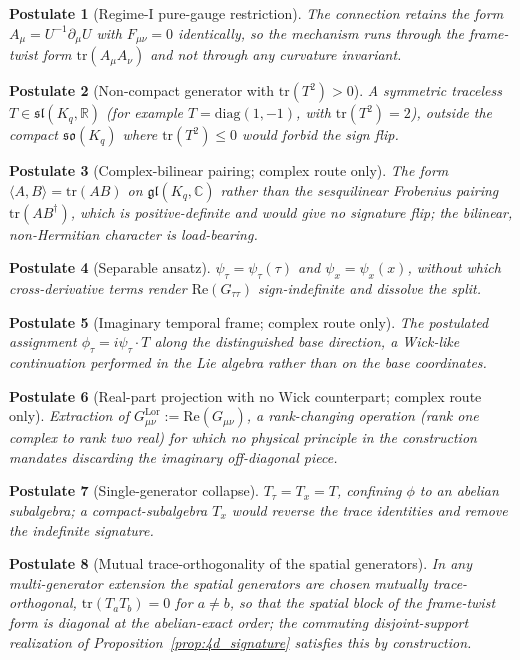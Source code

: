 \documentclass[11pt]{article}
\newtheorem{postulate}{Postulate}
\begin{document}
\begin{postulate}[Regime-I pure-gauge restriction]\label{post:regime1}
The connection retains the form $A_\mu = U^{-1}\partial_\mu U$ with $F_{\mu\nu} = 0$ identically, so the mechanism runs through the frame-twist form $\mathrm{tr}(A_\mu A_\nu)$ and not through any curvature invariant.
\end{postulate}
\begin{postulate}[Non-compact generator with $\mathrm{tr}(T^2) > 0$]\label{post:noncompact}
A symmetric traceless $T \in \mathfrak{sl}(K_q,\mathbb{R})$ (for example $T = \mathrm{diag}(1,-1)$, with $\mathrm{tr}(T^2) = 2$), outside the compact $\mathfrak{so}(K_q)$ where $\mathrm{tr}(T^2) \le 0$ would forbid the sign flip.
\end{postulate}
\begin{postulate}[Complex-bilinear pairing; complex route only]\label{post:pairing}
The form $\langle A, B\rangle = \mathrm{tr}(AB)$ on $\mathfrak{gl}(K_q,\mathbb{C})$ rather than the sesquilinear Frobenius pairing $\mathrm{tr}(AB^\dagger)$, which is positive-definite and would give no signature flip; the bilinear, non-Hermitian character is load-bearing.
\end{postulate}
\begin{postulate}[Separable ansatz]\label{post:separable}
$\psi_\tau = \psi_\tau(\tau)$ and $\psi_x = \psi_x(x)$, without which cross-derivative terms render $\mathrm{Re}(G_{\tau\tau})$ sign-indefinite and dissolve the split.
\end{postulate}
\begin{postulate}[Imaginary temporal frame; complex route only]\label{post:imaginary}
The postulated assignment $\phi_\tau = i\psi_\tau \cdot T$ along the distinguished base direction, a Wick-like continuation performed in the Lie algebra rather than on the base coordinates.
\end{postulate}
\begin{postulate}[Real-part projection with no Wick counterpart; complex route only]\label{post:realpart}
Extraction of $G^{\mathrm{Lor}}_{\mu\nu} := \mathrm{Re}(G_{\mu\nu})$, a rank-changing operation (rank one complex to rank two real) for which no physical principle in the construction mandates discarding the imaginary off-diagonal piece.
\end{postulate}
\begin{postulate}[Single-generator collapse]\label{post:collapse}
$T_\tau = T_x = T$, confining $\phi$ to an abelian subalgebra; a compact-subalgebra $T_x$ would reverse the trace identities and remove the indefinite signature.
\end{postulate}
\begin{postulate}[Mutual trace-orthogonality of the spatial generators]\label{post:traceorth}
In any multi-generator extension the spatial generators are chosen mutually trace-orthogonal, $\mathrm{tr}(T_a T_b) = 0$ for $a \neq b$, so that the spatial block of the frame-twist form is diagonal at the abelian-exact order; the commuting disjoint-support realization of Proposition~\ref{prop:4d_signature} satisfies this by construction.
\end{postulate}
\end{document}

